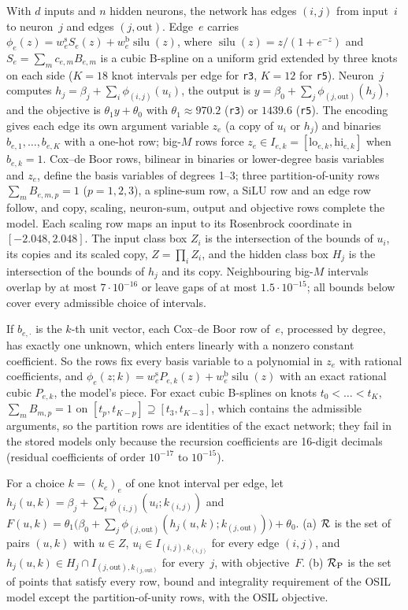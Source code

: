With $d$ inputs and $n$ hidden neurons, the network has edges $(i,j)$ from input~$i$ to neuron~$j$ and edges $(j,\mathrm{out})$.
Edge~$e$ carries $\phi_e(z)=w^{\mathrm s}_eS_e(z)+w^{\mathrm b}_e\operatorname{silu}(z)$, where $\operatorname{silu}(z)=z/(1+e^{-z})$ and $S_e=\sum_mc_{e,m}B_{e,m}$ is a cubic B-spline on a uniform grid extended by three knots on each side ($K=18$ knot intervals per edge for \texttt{r3}, $K=12$ for \texttt{r5}).
Neuron~$j$ computes $h_j=\beta_j+\sum_i\phi_{(i,j)}(u_i)$, the output is $y=\beta_0+\sum_j\phi_{(j,\mathrm{out})}(h_j)$, and the objective is $\theta_1y+\theta_0$ with $\theta_1\approx970.2$ (\texttt{r3}) or $1439.6$ (\texttt{r5}).
The encoding gives each edge its own argument variable $z_e$ (a copy of $u_i$ or $h_j$) and binaries $b_{e,1},\dots,b_{e,K}$ with a one-hot row; big-$M$ rows force $z_e\in I_{e,k}=[\mathrm{lo}_{e,k},\mathrm{hi}_{e,k}]$ when $b_{e,k}=1$.
Cox--de Boor rows, bilinear in binaries or lower-degree basis variables and $z_e$, define the basis variables of degrees 1--3; three partition-of-unity rows $\sum_mB_{e,m,p}=1$ ($p=1,2,3$), a spline-sum row, a SiLU row and an edge row follow, and copy, scaling, neuron-sum, output and objective rows complete the model.
Each scaling row maps an input to its Rosenbrock coordinate in $[-2.048,2.048]$.
The input class box $Z_i$ is the intersection of the bounds of $u_i$, its copies and its scaled copy, $Z=\prod_iZ_i$, and the hidden class box $H_j$ is the intersection of the bounds of $h_j$ and its copy.
Neighbouring big-$M$ intervals overlap by at most $7\cdot10^{-16}$ or leave gaps of at most $1.5\cdot10^{-15}$; all bounds below cover every admissible choice of intervals.

If $b_{e,\cdot}$ is the $k$-th unit vector, each Cox--de Boor row of~$e$, processed by degree, has exactly one unknown, which enters linearly with a nonzero constant coefficient.
So the rows fix every basis variable to a polynomial in $z_e$ with rational coefficients, and $\phi_e(z;k)=w^{\mathrm s}_eP_{e,k}(z)+w^{\mathrm b}_e\operatorname{silu}(z)$ with an exact rational cubic $P_{e,k}$, the model's piece.
For exact cubic B-splines on knots $t_0<\dots<t_K$, $\sum_mB_{m,p}=1$ on $[t_p,t_{K-p}]\supseteq[t_3,t_{K-3}]$, which contains the admissible arguments, so the partition rows are identities of the exact network; they fail in the stored models only because the recursion coefficients are 16-digit decimals (residual coefficients of order $10^{-17}$ to $10^{-15}$).

\begin{definition}\label{def:kan-relaxations}
For a choice $k=(k_e)_e$ of one knot interval per edge, let $h_j(u,k)=\beta_j+\sum_i\phi_{(i,j)}(u_i;k_{(i,j)})$ and $F(u,k)=\theta_1\bigl(\beta_0+\sum_j\phi_{(j,\mathrm{out})}(h_j(u,k);k_{(j,\mathrm{out})})\bigr)+\theta_0$.
(a) $\mathcal{R}$ is the set of pairs $(u,k)$ with $u\in Z$, $u_i\in I_{(i,j),k_{(i,j)}}$ for every edge $(i,j)$, and $h_j(u,k)\in H_j\cap I_{(j,\mathrm{out}),k_{(j,\mathrm{out})}}$ for every~$j$, with objective~$F$.
(b) $\mathcal{R}_{\mathrm{P}}$ is the set of points that satisfy every row, bound and integrality requirement of the OSIL model except the partition-of-unity rows, with the OSIL objective.
\end{definition}

